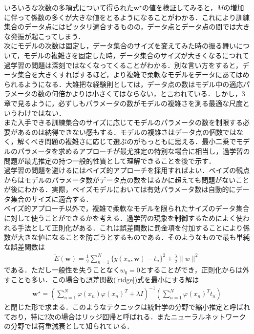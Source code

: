 \documentclass{jsarticle}
\theoremstyle{definition}
\numberwithin{equation}{section}
\begin{document}
いろいろな次数の多項式について得られた$\bm w^{\star}$の値を検証してみると，$M$の増加に伴って係数の多くが大きな値をとるようになることがわかる．これにより訓練集合のデータ点にはピッタリ適合するものの，データ点とデータ点の間では大きな発振が起こってしまう．\\

次にモデルの次数は固定し，データ集合のサイズを変えてみた時の振る舞いについて，モデルの複雑さを固定した時，データ集合のサイズが大きくなるにつれて過学習の問題は深刻ではなくなってくることがわかる．別な言い方をすると，データ集合を大きくすればするほど，より複雑で柔軟なモデルをデータにあてはめられるようになる．大雑把な経験則としては，データ点の数はモデル中の適応パラメータの数の何倍かよりは小さくてはならない，と言われている．しかし，3章で見るように，必ずしもパラメータの数がモデルの複雑さを測る最適な尺度というわけではない．\\

また入手できる訓練集合のサイズに応じてモデルのパラメータの数を制限する必要があるのは納得できない感もする．モデルの複雑さはデータ点の個数ではなく，解くべき問題の複雑さに応じて選ぶのがもっともに思える．最小二乗でモデルのパラメータを求めるアプローチが最尤推定の特別な場合に相当し，過学習の問題が最尤推定の持つ一般的性質として理解できることを後で示す．\\

過学習の問題を避けるにはベイズ的アプローチを採用すればよい．ベイズの観点からはモデルのパラメータ数がデータ点の数をはるかに超えても問題がないことが後にわかる．実際，ベイズモデルにおいては有効パラメータ数は自動的にデータ集合のサイズに適合する．\\

ベイズ的アプローチ以外で，複雑で柔軟なモデルを限られたサイズのデータ集合に対して使うことができるかを考える．過学習の現象を制御するためによく使われる手法として正則化がある．これは誤差関数に罰金項を付加することにより係数が大きな値になることを防ごうとするものである．そのようなもので最も単純な誤差関数は
\begin{align}
  \label{ridge}
\tilde E(\bm w) = \frac{1}{2}\sum_{n=1}^N\{y(x_n,\bm w)- t_n\}^2+\frac{\lambda}{2}\|w\|^2
\end{align}
である．ただし一般性を失うことなく$w_0 = 0$とすることができ，正則化からは外すことも多い．この場合も誤差関数(\ref*{ridge})式を最小にする解は
\begin{align*}
  \bm w^{\star} = \left( \sum_{n=1}^N\varphi(x_n)\varphi(x_n)^T + \lambda I\right)^{-1}\left( \sum_{n=1}^N\varphi(x_n)^T t_n \right)
  \end{align*}
と閉じた形で求まる．このようなテクニックは統計学の分野で縮小推定と呼ばれており，特に2次の場合はリッジ回帰と呼ばれる．またニューラルネットワークの分野では荷重減衰として知られている．\\
\end{document}
